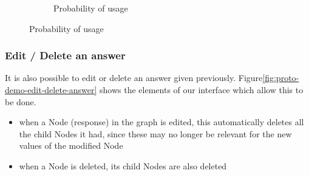 \begin{figure}[h]
\begin{subfigure}[b]{0.45\textwidth}
            \caption{\label{fig:proto-demo-add-answer-proba} Probability of usage}
        \end{subfigure}
    \end{figure}
    
    
    \subsubsection{Edit / Delete an answer}
    It is also possible to edit or delete an answer given previously. Figure\ref{fig:proto-demo-edit-delete-answer} shows the elements of our interface which allow this to be done. 
    
    \begin{itemize}
        \item when a Node (response) in the graph is edited, this automatically deletes all the child Nodes it had, since these may no longer be relevant for the new values of the modified Node
        \item when a Node is deleted, its child Nodes are also deleted
    \end{itemize}

